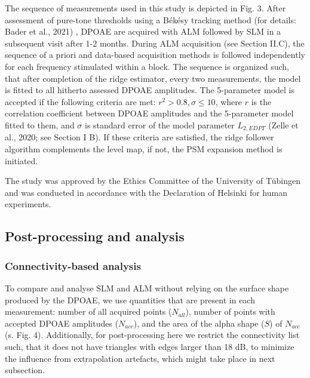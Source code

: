 \documentclass[journal,twoside,web]{ieeecolor2}
\begin{document}
The sequence of measurements used in this study is depicted in Fig. 3. After assessment of  pure-tone thresholds using a Békésy tracking method (for details: Bader et al., 2021) , DPOAE are acquired with ALM followed by SLM in a subsequent visit after 1-2 months. During ALM acquisition (see Section II.C), the sequence of a priori and data-based acquisition methods is followed independently for each frequency stimulated within a block. The sequence is organized such, that after completion of the ridge estimator, every two measurements, the model is fitted to all hitherto assessed DPOAE amplitudes. The 5-parameter model is accepted if the following criteria are met: $r^2 > 0.8, \sigma \le 10$, where $r$ is the correlation coefficient between DPOAE amplitudes and the 5-parameter model fitted to them, and $\sigma $ is standard error of the model parameter $L_{2, EDPT}$ (Zelle et al., 2020; see Section I B). If these criteria are satisfied, the ridge follower algorithm complements the level map, if not, the PSM expansion method is initiated. 

The study was approved by the Ethics Committee of the University of Tübingen and   was conducted in accordance with the Declaration of Helsinki for human experiments.

\subsection{Post-processing and analysis}

\subsubsection{Connectivity-based analysis}
To compare and analyse SLM and ALM without relying on the surface shape produced by the DPOAE, we use quantities that are present in each measurement: number of all acquired points ($N_{all}$), number of points with accepted DPOAE amplitudes ($N_{acc}$), and the area of the alpha shape ($S$) of $N_{acc}$ (s. Fig. 4). Additionally, for post-processing here we restrict the connectivity list such, that it does not have triangles with edges larger than 18 dB, to minimize the influence from extrapolation artefacts, which might take place in next subsection.
\end{document}
